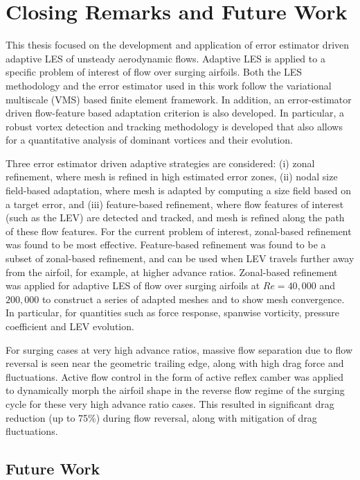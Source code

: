 \chapter{Closing Remarks and Future Work}

This thesis focused on the development and application of error estimator driven adaptive LES of unsteady aerodynamic flows.
Adaptive LES is applied to a specific problem of interest of flow over surging airfoils.
Both the LES methodology and the error estimator used in this work follow the variational multiscale (VMS) based finite element framework.
In addition, an error-estimator driven flow-feature based adaptation criterion is also developed. In particular, a robust vortex detection and tracking methodology is developed that also allows for a quantitative analysis of dominant vortices and their evolution.

Three error estimator driven adaptive strategies are considered: (i) zonal refinement, where mesh is refined in high estimated error zones, (ii) nodal size field-based adaptation, where mesh is adapted by computing a size field based on a target error, and (iii) feature-based refinement, where flow features of interest (such as the LEV) are detected and tracked, and mesh is refined along the path of these flow features.
For the current problem of interest, zonal-based refinement was found to be most effective.
Feature-based refinement was found to be a subset of zonal-based refinement, and can be used when LEV travels further away from the airfoil, 
for example, at higher advance ratios.
Zonal-based refinement was applied for adaptive LES of flow over surging airfoils at $Re=40,000$ and $200,000$ to construct a series of adapted meshes and to show mesh convergence. In particular, for quantities such as force response, spanwise vorticity, pressure coefficient and LEV evolution.

For surging cases at very high advance ratios, massive flow separation due to flow reversal is seen near the geometric trailing edge, along with high drag force and fluctuations. 
Active flow control in the form of active reflex camber was applied to dynamically morph the airfoil shape in the reverse flow regime of the surging cycle for these very high advance ratio cases.
This resulted in significant drag reduction (up to 75\%) during flow reversal, along with mitigation of drag fluctuations.

\section{Future Work}

